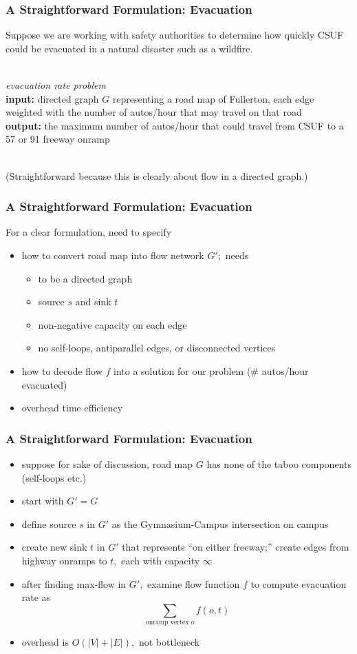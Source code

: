 \documentclass{beamer}
\newcommand{\stanza}{ \\~\ }
\begin{document}
\begin{frame} \frametitle{A Straightforward Formulation: Evacuation}
Suppose we are working with safety authorities to determine how quickly CSUF
could be evacuated in a natural disaster such as a wildfire. \stanza

\emph{evacuation rate problem} \\
\textbf{input:} directed graph $G$ representing a road map of Fullerton, each edge
weighted with the number of autos/hour that may travel on that road \\
\textbf{output:} the maximum number of autos/hour that could travel from CSUF to
a 57 or 91 freeway onramp \stanza

(Straightforward because this is clearly about flow in a directed graph.)
\end{frame}

\begin{frame} \frametitle{A Straightforward Formulation: Evacuation}
For a clear formulation, need to specify
\begin{itemize}
  \item how to convert road map into flow network $G';$ needs
  \begin{itemize}
    \item to be a directed graph
    \item source $s$ and sink $t$
    \item non-negative capacity on each edge
    \item no self-loops, antiparallel edges, or disconnected vertices
  \end{itemize}
  \item how to decode flow $f$ into a solution for our problem (\# autos/hour evacuated)
  \item overhead time efficiency
\end{itemize}
\end{frame}

\begin{frame} \frametitle{A Straightforward Formulation: Evacuation}
\begin{itemize}
  \item suppose for sake of discussion, road map $G$ has none of the taboo components (self-loops etc.)
  \item start with $G'=G$
  \item define source $s$ in $G'$ as the Gymnasium-Campus intersection on campus
  \item create new sink $t$ in $G'$ that represents ``on either freeway;''
    create edges from highway onramps to $t,$ each with capacity $\infty$
  \item after finding max-flow in $G',$ examine flow function $f$ to compute
    evacuation rate as
    \[ \sum_{\text{onramp vertex }o} f(o, t) \]
  \item overhead is $O(|V|+|E|),$ not bottleneck
\end{itemize}
\end{frame}
\end{document}
